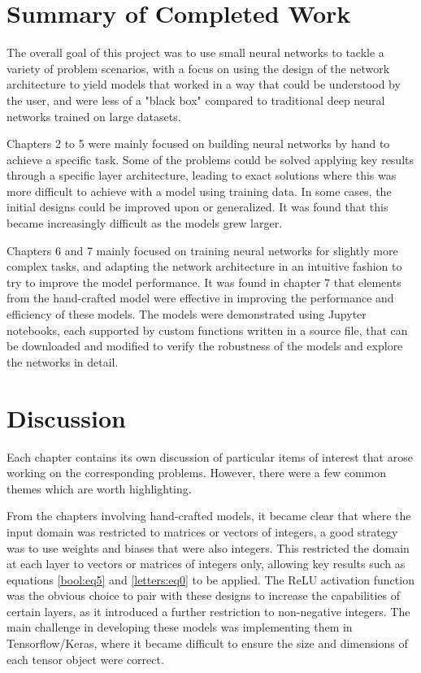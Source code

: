 \documentclass{somasmsc}
\begin{document}
\section{Summary of Completed Work}

The overall goal of this project was to use small neural networks to tackle a variety of problem scenarios, with a focus on using the design of the network architecture to yield models that worked in a way that could be understood by the user, and were less of a "black box" compared to traditional deep neural networks trained on large datasets.

Chapters 2 to 5 were mainly focused on building neural networks by hand to achieve a specific task. Some of the problems could be solved applying key results through a specific layer architecture, leading to exact solutions where this was more difficult to achieve with a model using training data. In some cases, the initial designs could be improved upon or generalized. It was found that this became increasingly difficult as the models grew larger.

Chapters 6 and 7 mainly focused on training neural networks for slightly more complex tasks, and adapting the network architecture in an intuitive fashion to try to improve the model performance. It was found in chapter 7 that elements from the hand-crafted model were effective in improving the performance and efficiency of these models. The models were demonstrated using Jupyter notebooks, each supported by custom functions written in a source file, that can be downloaded and modified to verify the robustness of the models and explore the networks in detail.

\section{Discussion}

Each chapter contains its own discussion of particular items of interest that arose working on the corresponding problems. However, there were a few common themes which are worth highlighting.

From the chapters involving hand-crafted models, it became clear that where the input domain was restricted to matrices or vectors of integers, a good strategy was to use weights and biases that were also integers. This restricted the domain at each layer to vectors or matrices of integers only, allowing key results such as equations \ref{bool:eq5} and \ref{letters:eq0} to be applied. The ReLU activation function was the obvious choice to pair with these designs to increase the capabilities of certain layers, as it introduced a further restriction to non-negative integers. The main challenge in developing these models was implementing them in Tensorflow/Keras, where it became difficult to ensure the size and dimensions of each tensor object were correct.
\end{document}
